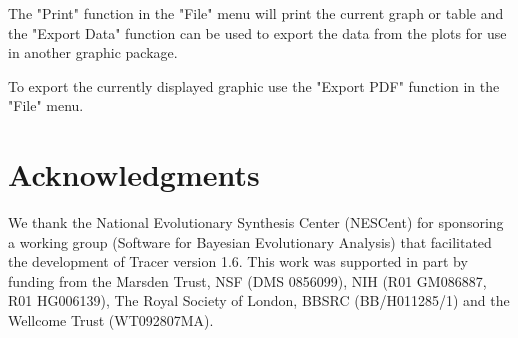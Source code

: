 \documentclass{bioinfo}
\begin{document}



The "Print" function in the "File" menu will print the current graph or table and the "Export Data" function can be used to export the data from the plots for use in another graphic package.

To export the currently displayed graphic use the "Export PDF" function in the "File" menu.



\section*{Acknowledgments}

We thank the National Evolutionary Synthesis Center (NESCent) for sponsoring a working group (Software for Bayesian Evolutionary Analysis) that facilitated the development of Tracer version 1.6. 
This work was supported in part by funding from the Marsden Trust, NSF (DMS 0856099), NIH (R01 GM086887, R01 HG006139), The Royal Society of London, BBSRC (BB/H011285/1) and the Wellcome Trust (WT092807MA).



\end{document}
